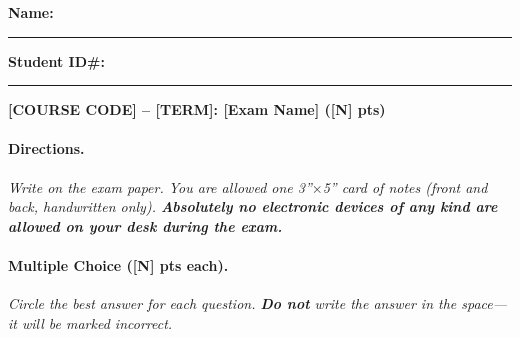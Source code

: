 \documentclass{article}
\date{}
\makeatletter
\newif\ifanswers
\newcommand{\issuedto}{%
  \ifx\studentname\@empty\else
    \noindent{\sffamily\footnotesize\color{black!55}Issued to: \studentname}%
    \par\vspace{4pt}%
  \fi%
}
\makeatother
\begin{document}

\issuedto
\noindent\textbf{Name:}~\rule{0.35\linewidth}{0.4pt}%
\hspace{0.05\linewidth}%
\textbf{Student ID\#:}~\rule{0.20\linewidth}{0.4pt}

\medskip
\noindent\textbf{[COURSE CODE] -- [TERM]: [Exam Name] ([N] pts)}

\ifanswers
  \begin{center}\large\textbf{*** ANSWER KEY --- NOT FOR DISTRIBUTION ***}\end{center}
\fi


\paragraph*{Directions.}
\textit{Write on the exam paper.
You are allowed one 3''$\times$5'' card of notes (front and back, handwritten only).
\textbf{Absolutely no electronic devices of any kind are allowed on your desk
during the exam.}}


\paragraph*{Multiple Choice ([N] pts each).}
\textit{Circle the best answer for each question.
\textbf{Do not} write the answer in the space---it will be marked incorrect.}
\end{document}
